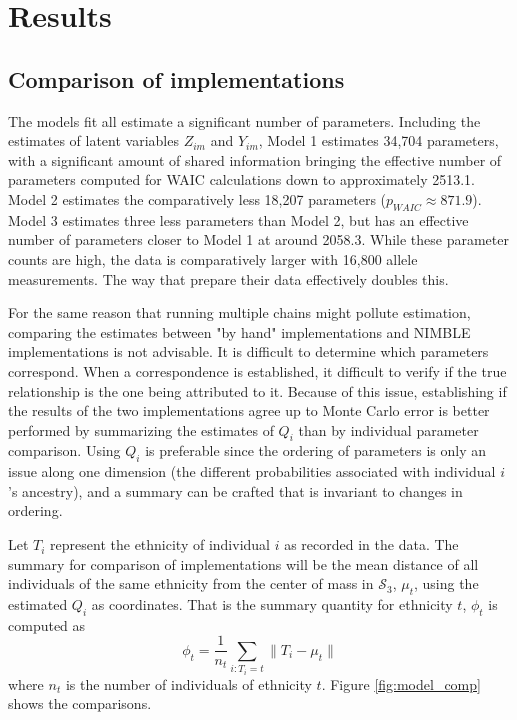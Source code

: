\documentclass{article}
\begin{document}
\section{Results}\label{sec:results}

\subsection{Comparison of implementations}

The models fit all estimate a significant number of parameters. Including the estimates of latent variables $Z_{im}$ and $Y_{im}$, Model 1 estimates 34,704 parameters, with a significant amount of shared information bringing the effective number of parameters computed for WAIC calculations down to approximately 2513.1. Model 2 estimates the comparatively less 18,207 parameters ($p_{WAIC}\approx 871.9$). Model 3 estimates three less parameters than Model 2, but has an effective number of parameters closer to Model 1 at around 2058.3. While these parameter counts are high, the data is comparatively larger with 16,800 allele measurements. The way that \citeauthor{efron2016CASI} prepare their data effectively doubles this.

For the same reason that running multiple chains might pollute estimation, comparing the estimates between "by hand" implementations and NIMBLE implementations is not advisable. It is difficult to determine which parameters correspond. When a correspondence is established, it difficult to verify if the true relationship is the one being attributed to it. Because of this issue, establishing if the results of the two implementations agree up to Monte Carlo error is better performed by summarizing the estimates of $Q_i$ than by individual parameter comparison. Using $Q_i$ is preferable since the ordering of parameters is only an issue along one dimension (the different probabilities associated with individual $i$'s ancestry), and a summary can be crafted that is invariant to changes in ordering.

Let $T_i$ represent the ethnicity of individual $i$ as recorded in the data. The summary for comparison of implementations will be the mean distance of all individuals of the same ethnicity from the center of mass in $\mathcal{S}_3$, $\mu_t$, using the estimated $Q_i$ as coordinates. That is the summary quantity for ethnicity $t$, $\phi_t$ is computed as
\begin{equation*}
    \phi_t = \frac{1}{n_t} \sum_{i: T_i = t} \lVert T_i - \mu_t \rVert
\end{equation*}
where $n_t$ is the number of individuals of ethnicity $t$. Figure \ref{fig:model_comp} shows the comparisons.
\end{document}
